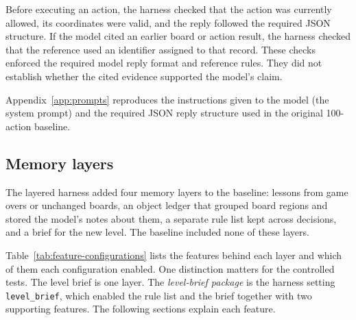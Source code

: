 Before executing an action, the harness checked that the action was currently allowed, its coordinates were valid, and the reply followed the required JSON structure. If the model cited an earlier board or action result, the harness checked that the reference used an identifier assigned to that record. These checks enforced the required model reply format and reference rules. They did not establish whether the cited evidence supported the model's claim.

Appendix~\ref{app:prompts} reproduces the instructions given to the model (the system prompt) and the required JSON reply structure used in the original 100-action baseline.

\subsection{Memory layers}\label{sec:layers}
The layered harness added four memory layers to the baseline: lessons from game overs or unchanged boards, an object ledger that grouped board regions and stored the model's notes about them, a separate rule list kept across decisions, and a brief for the new level. The baseline included none of these layers.

Table~\ref{tab:feature-configurations} lists the features behind each layer and which of them each configuration enabled. One distinction matters for the controlled tests. The level brief is one layer. The \emph{level-brief package} is the harness setting \texttt{level\_brief}, which enabled the rule list and the brief together with two supporting features. The following sections explain each feature.

